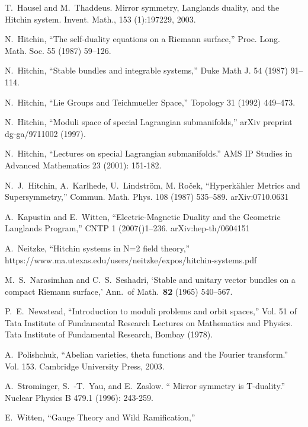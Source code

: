 \documentclass[oneside,english]{amsbook}
\theoremstyle{definition}
\numberwithin{section}{chapter}
\numberwithin{equation}{section}
\numberwithin{figure}{section}
\theoremstyle{plain}
\theoremstyle{definition}
\theoremstyle{remark}
\theoremstyle{definition}
\theoremstyle{definition}
\theoremstyle{plain}
\theoremstyle{plain}
\begin{document}
\begin{thebibliography}{AB}
T.~Hausel and M.~Thaddeus. Mirror symmetry, Langlands
duality, and the Hitchin system. Invent. Math., 153 (1):197\textendash{}229,
2003.

N.~Hitchin, ``The self-duality equations on a Riemann
surface,'' Proc. Long. Math. Soc. 55 (1987) 59--126.

N.~Hitchin, ``Stable bundles and integrable systems,''
Duke Math J. 54 (1987) 91--114.

N.~Hitchin, ``Lie Groups and Teichmueller Space,''
Topology 31 (1992) 449--473.

N.~Hitchin, ``Moduli space of special Lagrangian
  submanifolds,'' arXiv preprint dg-ga/9711002 (1997).

N.~Hitchin, ``Lectures on special Lagrangian
  submanifolds.'' AMS IP Studies in Advanced Mathematics 23 (2001):
  151-182.

  N.~J.~Hitchin, A.~Karlhede, U.~Lindstr\"om, M. Ro\v{c}ek,
  ``Hyperk\"ahler Metrics and Supersymmetry,''
  Commun. Math. Phys. 108 (1987) 535--589.
arXiv:0710.0631

A.~Kapustin and E.~Witten, ``Electric-Magnetic
Duality and the Geometric Langlands Program,'' CNTP 1 (2007()1--236.
arXiv:hep-th/0604151

A.~Neitzke, ``Hitchin systems in N=2 field theory,''
https://www.ma.utexas.edu/users/neitzke/expos/hitchin-systems.pdf

M.~S.~Narasimhan and C.~S.~Seshadri, `Stable
and unitary vector bundles on a compact Riemann surface,' Ann.~of
Math.~\textbf{82} (1965) 540--567.

P.~E.~Newstead, ``Introduction to moduli problems and
orbit spaces,'' Vol. 51 of Tata Institute of Fundamental Research
Lectures on Mathematics and Physics. Tata Institute of Fundamental
Research, Bombay (1978).

A.~Polishchuk, ``Abelian varieties, theta functions and
  the Fourier transform.'' Vol. 153. Cambridge University Press,
  2003.

A.~Strominger, S.~-T.~Yau, and E.~Zaslow. `` Mirror
  symmetry is T-duality.'' Nuclear Physics B 479.1 (1996): 243-259.

E.~Witten, ``Gauge Theory and Wild Ramification,''

\end{thebibliography}
\end{document}
